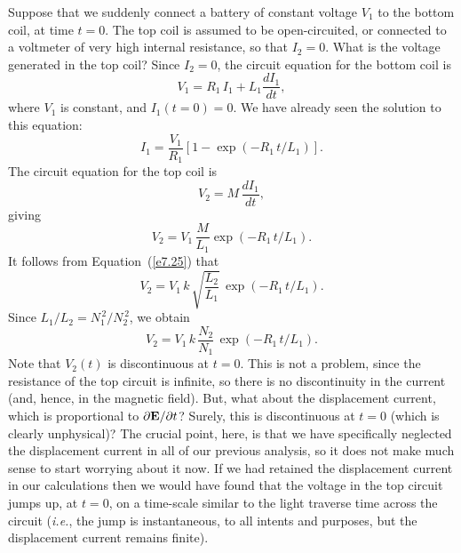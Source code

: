 Suppose that we suddenly connect a battery of constant voltage
$V_1$ to the bottom coil, at  time $t=0$. The top coil is assumed to be
open-circuited, or connected to a voltmeter of very high internal resistance,
so that $I_2=0$. What is the voltage generated in the top coil?
Since $I_2=0$, the circuit equation for the bottom coil is
\begin{equation}
V_1 = R_1 \,I_1 + L_1 \frac{d I_1}{dt},
\end{equation}
where $V_1$ is constant, and $I_1(t=0)=0$. We have already seen the solution to
this equation:
\begin{equation}
I_1 = \frac{V_1}{R_1} \left[ 1 - \exp(-R_1\, t/L_1)\right].
\end{equation}
The circuit equation for the top coil is
\begin{equation}
V_2 = M \,\frac{d I_1}{dt},
\end{equation}
giving 
\begin{equation}
V_2 = V_1\, \frac{M}{L_1} \exp(- R_1\, t/L_1).
\end{equation}
It follows from Equation~(\ref{e7.25}) that
\begin{equation}
V_2 = V_1 \,k \,\sqrt{\frac{L_2}{L_1}} \,\exp(- R_1\, t/L_1).
\end{equation}
Since $L_1/L_2 =N_1^{\,2}/N_2^{\,2}$, we obtain
\begin{equation}
V_2 = V_1\, k \,\frac{N_2}{N_1} \,\exp(-R_1 \,t/L_1).
\end{equation}
Note that $V_2(t)$ is discontinuous at $t=0$. This is not a problem, since the
resistance of the top circuit is infinite, so there is no discontinuity in the
current (and, hence, in the magnetic field). But, what about the displacement current,
which is proportional to $\partial {\bf E}/\partial t$? Surely, this is discontinuous
at $t=0$ (which is clearly unphysical)? The crucial point, here,
 is that we have specifically
neglected the displacement current in all of our previous analysis, so it does not
make much sense to start worrying about it now. If we had retained the displacement
current in our calculations then
 we would have found that the voltage in the top circuit jumps up,
at $t=0$, on a time-scale similar to the light traverse time across the circuit
({\em i.e.}, the jump is instantaneous, to all intents and purposes, but the
displacement current remains finite). 

